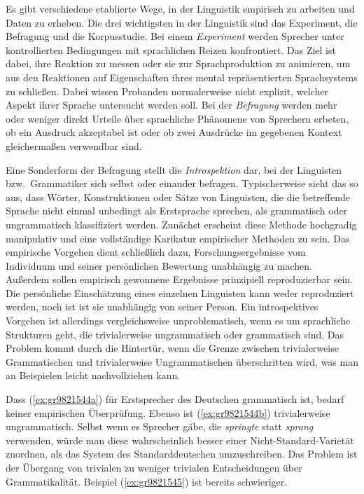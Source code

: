 Es gibt verschiedene etablierte Wege, in der Linguistik empirisch zu arbeiten und Daten zu erheben.
Die drei wichtigsten in der Linguistik sind das Experiment, die Befragung und die Korpusstudie.
Bei einem \textit{Experiment} werden Sprecher unter kontrollierten Bedingungen mit sprachlichen Reizen konfrontiert.
Das Ziel ist dabei, ihre Reaktion zu messen oder sie zur Sprachproduktion zu animieren, um aus den Reaktionen auf Eigenschaften ihres mental repräsentierten Sprachsystems zu schließen.
Dabei wissen Probanden normalerweise nicht explizit, welcher Aspekt ihrer Sprache untersucht werden soll.
Bei der \textit{Befragung} werden mehr oder weniger direkt Urteile über sprachliche Phänomene von Sprechern erbeten, \zB ob ein Ausdruck akzeptabel ist oder ob zwei Ausdrücke im gegebenen Kontext gleichermaßen verwendbar sind.

Eine Sonderform der Befragung stellt die \textit{Introspektion} dar, bei der Linguisten bzw.\ Grammatiker sich selbst oder einander befragen.
Typischerweise sieht das so aus, dass Wörter, Konstruktionen oder Sätze von Linguisten, die die betreffende Sprache nicht einmal unbedingt als Erstsprache sprechen, als grammatisch oder ungrammatisch klassifiziert werden.
Zunächst erscheint diese Methode hochgradig manipulativ und eine vollständige Karikatur empirischer Methoden zu sein.
Das empirische Vorgehen dient schließlich dazu, Forschungsergebnisse vom Individuum und seiner persönlichen Bewertung unabhängig zu machen.
Außerdem sollen empirisch gewonnene Ergebnisse prinzipiell reproduzierbar sein.
Die persönliche Einschätzung eines einzelnen Linguisten kann weder reproduziert werden, noch ist ist sie unabhängig von seiner Person.
Ein introspektives Vorgehen ist allerdings vergleichsweise unproblematisch, wenn es um sprachliche Strukturen geht, die trivialerweise ungrammatisch oder grammatisch sind.
Das Problem kommt durch die Hintertür, wenn die Grenze zwischen trivialerweise Grammatischen und trivialerweise Ungrammatischen überschritten wird, was man an Beispielen leicht nachvollziehen kann.

\begin{exe}
	\ex\label{ex:gr9821544}
	\begin{xlist}
	\end{xlist}
\end{exe}

Dass (\ref{ex:gr9821544a}) für Erstsprecher des Deutschen grammatisch ist, bedarf keiner empirischen Überprüfung.
Ebenso ist (\ref{ex:gr9821544b}) trivialerweise ungrammatisch.
Selbst wenn es Sprecher gäbe, die \textit{springte} statt \textit{sprang} verwenden, würde man diese wahrscheinlich besser einer Nicht-Standard-Varietät zuordnen, als das System des Standarddeutschen umzuschreiben.
Das Problem ist der Übergang von trivialen zu weniger trivialen Entscheidungen über Grammatikalität.
Beispiel (\ref{ex:gr9821545}) ist bereits schwieriger.

